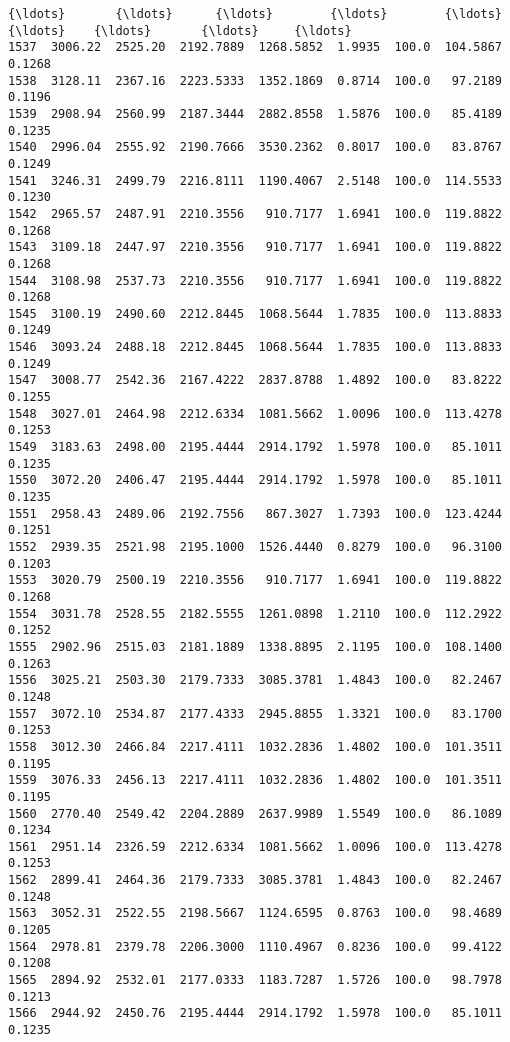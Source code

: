 \documentclass[11pt]{article}
\begin{document}
\begin{Verbatim}[commandchars=\\\{\}]
{\ldots}       {\ldots}      {\ldots}        {\ldots}        {\ldots}     {\ldots}    {\ldots}       {\ldots}     {\ldots}   
1537  3006.22  2525.20  2192.7889  1268.5852  1.9935  100.0  104.5867  0.1268   
1538  3128.11  2367.16  2223.5333  1352.1869  0.8714  100.0   97.2189  0.1196   
1539  2908.94  2560.99  2187.3444  2882.8558  1.5876  100.0   85.4189  0.1235   
1540  2996.04  2555.92  2190.7666  3530.2362  0.8017  100.0   83.8767  0.1249   
1541  3246.31  2499.79  2216.8111  1190.4067  2.5148  100.0  114.5533  0.1230   
1542  2965.57  2487.91  2210.3556   910.7177  1.6941  100.0  119.8822  0.1268   
1543  3109.18  2447.97  2210.3556   910.7177  1.6941  100.0  119.8822  0.1268   
1544  3108.98  2537.73  2210.3556   910.7177  1.6941  100.0  119.8822  0.1268   
1545  3100.19  2490.60  2212.8445  1068.5644  1.7835  100.0  113.8833  0.1249   
1546  3093.24  2488.18  2212.8445  1068.5644  1.7835  100.0  113.8833  0.1249   
1547  3008.77  2542.36  2167.4222  2837.8788  1.4892  100.0   83.8222  0.1255   
1548  3027.01  2464.98  2212.6334  1081.5662  1.0096  100.0  113.4278  0.1253   
1549  3183.63  2498.00  2195.4444  2914.1792  1.5978  100.0   85.1011  0.1235   
1550  3072.20  2406.47  2195.4444  2914.1792  1.5978  100.0   85.1011  0.1235   
1551  2958.43  2489.06  2192.7556   867.3027  1.7393  100.0  123.4244  0.1251   
1552  2939.35  2521.98  2195.1000  1526.4440  0.8279  100.0   96.3100  0.1203   
1553  3020.79  2500.19  2210.3556   910.7177  1.6941  100.0  119.8822  0.1268   
1554  3031.78  2528.55  2182.5555  1261.0898  1.2110  100.0  112.2922  0.1252   
1555  2902.96  2515.03  2181.1889  1338.8895  2.1195  100.0  108.1400  0.1263   
1556  3025.21  2503.30  2179.7333  3085.3781  1.4843  100.0   82.2467  0.1248   
1557  3072.10  2534.87  2177.4333  2945.8855  1.3321  100.0   83.1700  0.1253   
1558  3012.30  2466.84  2217.4111  1032.2836  1.4802  100.0  101.3511  0.1195   
1559  3076.33  2456.13  2217.4111  1032.2836  1.4802  100.0  101.3511  0.1195   
1560  2770.40  2549.42  2204.2889  2637.9989  1.5549  100.0   86.1089  0.1234   
1561  2951.14  2326.59  2212.6334  1081.5662  1.0096  100.0  113.4278  0.1253   
1562  2899.41  2464.36  2179.7333  3085.3781  1.4843  100.0   82.2467  0.1248   
1563  3052.31  2522.55  2198.5667  1124.6595  0.8763  100.0   98.4689  0.1205   
1564  2978.81  2379.78  2206.3000  1110.4967  0.8236  100.0   99.4122  0.1208   
1565  2894.92  2532.01  2177.0333  1183.7287  1.5726  100.0   98.7978  0.1213   
1566  2944.92  2450.76  2195.4444  2914.1792  1.5978  100.0   85.1011  0.1235   


\end{Verbatim}
\end{document}
